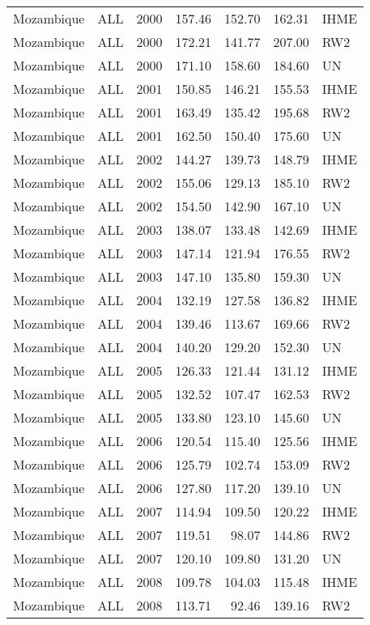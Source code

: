 \begin{longtable}{lllrrrl}
  Mozambique & ALL & 2000 & 157.46 & 152.70 & 162.31 & IHME \\ 
  Mozambique & ALL & 2000 & 172.21 & 141.77 & 207.00 & RW2 \\ 
  Mozambique & ALL & 2000 & 171.10 & 158.60 & 184.60 & UN \\ 
  Mozambique & ALL & 2001 & 150.85 & 146.21 & 155.53 & IHME \\ 
  Mozambique & ALL & 2001 & 163.49 & 135.42 & 195.68 & RW2 \\ 
  Mozambique & ALL & 2001 & 162.50 & 150.40 & 175.60 & UN \\ 
  Mozambique & ALL & 2002 & 144.27 & 139.73 & 148.79 & IHME \\ 
  Mozambique & ALL & 2002 & 155.06 & 129.13 & 185.10 & RW2 \\ 
  Mozambique & ALL & 2002 & 154.50 & 142.90 & 167.10 & UN \\ 
  Mozambique & ALL & 2003 & 138.07 & 133.48 & 142.69 & IHME \\ 
  Mozambique & ALL & 2003 & 147.14 & 121.94 & 176.55 & RW2 \\ 
  Mozambique & ALL & 2003 & 147.10 & 135.80 & 159.30 & UN \\ 
  Mozambique & ALL & 2004 & 132.19 & 127.58 & 136.82 & IHME \\ 
  Mozambique & ALL & 2004 & 139.46 & 113.67 & 169.66 & RW2 \\ 
  Mozambique & ALL & 2004 & 140.20 & 129.20 & 152.30 & UN \\ 
  Mozambique & ALL & 2005 & 126.33 & 121.44 & 131.12 & IHME \\ 
  Mozambique & ALL & 2005 & 132.52 & 107.47 & 162.53 & RW2 \\ 
  Mozambique & ALL & 2005 & 133.80 & 123.10 & 145.60 & UN \\ 
  Mozambique & ALL & 2006 & 120.54 & 115.40 & 125.56 & IHME \\ 
  Mozambique & ALL & 2006 & 125.79 & 102.74 & 153.09 & RW2 \\ 
  Mozambique & ALL & 2006 & 127.80 & 117.20 & 139.10 & UN \\ 
  Mozambique & ALL & 2007 & 114.94 & 109.50 & 120.22 & IHME \\ 
  Mozambique & ALL & 2007 & 119.51 & 98.07 & 144.86 & RW2 \\ 
  Mozambique & ALL & 2007 & 120.10 & 109.80 & 131.20 & UN \\ 
  Mozambique & ALL & 2008 & 109.78 & 104.03 & 115.48 & IHME \\ 
  Mozambique & ALL & 2008 & 113.71 & 92.46 & 139.16 & RW2 \\ 

\end{longtable}
